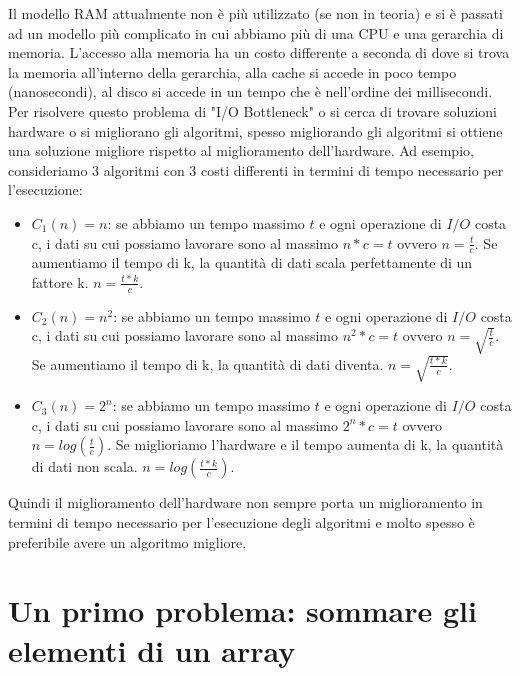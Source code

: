 \documentclass[14pt]{extreport}
\begin{document}
Il modello RAM attualmente non è più utilizzato (se non in teoria) e si è passati ad un modello più complicato in cui abbiamo più di una CPU e una gerarchia di memoria. L'accesso alla memoria ha un costo differente a seconda di dove si trova la memoria all'interno della gerarchia, alla cache si accede in poco tempo (nanosecondi), al disco si accede in un tempo che è nell'ordine dei millisecondi. 
Per risolvere questo problema di "I/O Bottleneck" o si cerca di trovare soluzioni hardware o si migliorano gli algoritmi, spesso migliorando gli algoritmi si ottiene una soluzione migliore rispetto al miglioramento dell'hardware.
Ad esempio, consideriamo 3 algoritmi con 3 costi differenti in termini di tempo necessario per l'esecuzione:
\begin{itemize}
    \item $C_1(n) = n$: se abbiamo un tempo massimo $t$ e ogni operazione di $I/O$ costa c, i dati su cui possiamo lavorare sono al massimo $n*c = t$ ovvero $n = \frac{t}{c}$. Se aumentiamo il tempo di k, la quantità di dati scala perfettamente di un fattore k. $n = \frac{t*k}{c}$.
    \item $C_2(n) = n^2$: se abbiamo un tempo massimo $t$ e ogni operazione di $I/O$ costa c, i dati su cui possiamo lavorare sono al massimo $n^2*c = t$ ovvero $n = \sqrt{\frac{t}{c}}$. Se aumentiamo il tempo di k, la quantità di dati diventa. $n = \sqrt{\frac{t*k}{c}}$.
    \item $C_3(n) = 2^n$: se abbiamo un tempo massimo $t$ e ogni operazione di $I/O$ costa c, i dati su cui possiamo lavorare sono al massimo $2^n*c = t$ ovvero $n = log(\frac{t}{c})$. Se miglioriamo l'hardware e il tempo aumenta di k, la quantità di dati non scala. $n = log(\frac{t*k}{c})$.
\end{itemize}

Quindi il miglioramento dell'hardware non sempre porta un miglioramento in termini di tempo necessario per l'esecuzione degli algoritmi e molto spesso è preferibile avere un algoritmo migliore.

\section{Un primo problema: sommare gli elementi di un array}
\end{document}
